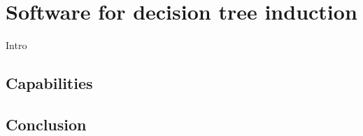 \chapter{Software for decision tree induction}\label{cha:software}
Intro


\section{Capabilities}

\section{Conclusion}
